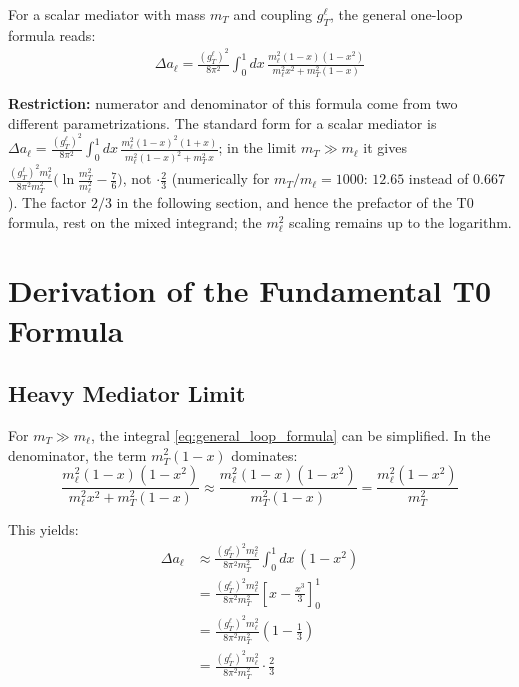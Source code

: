 	For a scalar mediator with mass $m_T$ and coupling $g_T^\ell$, the general one-loop formula reads:
	\begin{equation}
		\begin{split}
			\Delta a_\ell = \frac{(g_T^\ell)^2}{8\pi^2} \int_0^1 dx \, 
			\frac{m_\ell^2 (1-x)(1-x^2)}{m_\ell^2 x^2 + m_T^2 (1-x)}
		\end{split}
		\label{eq:general_loop_formula}
	\end{equation}
	
	\textbf{Restriction:} numerator and denominator of this formula come from two different parametrizations. The standard form for a scalar mediator is $\Delta a_\ell = \frac{(g_T^\ell)^2}{8\pi^2}\int_0^1 dx\,\frac{m_\ell^2(1-x)^2(1+x)}{m_\ell^2(1-x)^2 + m_T^2\,x}$; in the limit $m_T \gg m_\ell$ it gives $\frac{(g_T^\ell)^2 m_\ell^2}{8\pi^2 m_T^2}\bigl(\ln\frac{m_T^2}{m_\ell^2} - \frac76\bigr)$, not $\cdot\frac23$ (numerically for $m_T/m_\ell = 1000$: $12.65$ instead of $0.667$). The factor $2/3$ in the following section, and hence the prefactor of the T0 formula, rest on the mixed integrand; the $m_\ell^2$ scaling remains up to the logarithm.
	
	\section{Derivation of the Fundamental T0 Formula}
	
	\subsection{Heavy Mediator Limit}
	
	For $m_T \gg m_\ell$, the integral \eqref{eq:general_loop_formula} can be simplified. In the denominator, the term $m_T^2 (1-x)$ dominates:
	\begin{equation}
		\frac{m_\ell^2 (1-x)(1-x^2)}{m_\ell^2 x^2 + m_T^2 (1-x)} 
		\approx \frac{m_\ell^2 (1-x)(1-x^2)}{m_T^2 (1-x)} 
		= \frac{m_\ell^2 (1-x^2)}{m_T^2}
		\label{eq:heavy_mediator_approx}
	\end{equation}
	
	This yields:
	\begin{equation}
		\begin{split}
			\Delta a_\ell &\approx \frac{(g_T^\ell)^2 m_\ell^2}{8\pi^2 m_T^2} \int_0^1 dx \, (1-x^2) \\
			&= \frac{(g_T^\ell)^2 m_\ell^2}{8\pi^2 m_T^2} \left[x - \frac{x^3}{3}\right]_0^1 \\
			&= \frac{(g_T^\ell)^2 m_\ell^2}{8\pi^2 m_T^2} \left(1 - \frac{1}{3}\right) \\
			&= \frac{(g_T^\ell)^2 m_\ell^2}{8\pi^2 m_T^2} \cdot \frac{2}{3}
		\end{split}
		\label{eq:integral_evaluation}
	\end{equation}
	
